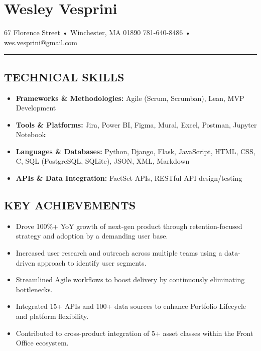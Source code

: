 \section{Wesley Vesprini}\label{nameplate}

67 Florence Street • Winchester, MA 01890
\href{https://www.linkedin.com/in/wesley-vesprini-05bb1823/}{\emph{}}
781-640-8486 • wes.vesprini@gmail.com

\begin{center}\rule{0.5\linewidth}{0.5pt}\end{center}

\subsection{TECHNICAL SKILLS}\label{technical-skills}

\begin{itemize}
\tightlist
\item
  \textbf{Frameworks \& Methodologies:} Agile (Scrum, Scrumban), Lean,
  MVP Development
\item
  \textbf{Tools \& Platforms:} Jira, Power BI, Figma, Mural, Excel,
  Postman, Jupyter Notebook
\item
  \textbf{Languages \& Databases:} Python, Django, Flask, JavaScript,
  HTML, CSS, C, SQL (PostgreSQL, SQLite), JSON, XML, Markdown
\item
  \textbf{APIs \& Data Integration:} FactSet APIs, RESTful API
  design/testing
\end{itemize}

\subsection{KEY ACHIEVEMENTS}\label{key-achievements}

\begin{itemize}
\tightlist
\item
  Drove 100\%+ YoY growth of next-gen product through retention-focused
  strategy and adoption by a demanding user base.
\item
  Increased user research and outreach across multiple teams using a
  data-driven approach to identify user segments.
\item
  Streamlined Agile workflows to boost delivery by continuously
  eliminating bottlenecks.
\item
  Integrated 15+ APIs and 100+ data sources to enhance Portfolio
  Lifecycle and platform flexibility.
\item
  Contributed to cross-product integration of 5+ asset classes within
  the Front Office ecosystem.
\end{itemize}


